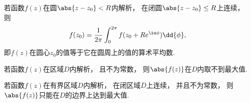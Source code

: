 \begin{theorem}[解析函数的平均值定理]\label{theorem:解析函数的积分表示.平均值定理}
若函数\(f(z)\)在圆\(\abs{z-z_0}<R\)内解析，
在闭圆\(\abs{z-z_0} \leq R\)上连续，
则\begin{equation*}
	f(z_0)
	= \frac{1}{2\pi} \int_0^{2\pi} f(z_0+Re^{\iu\phi}) \dd{\phi},
\end{equation*}
即\(f(z)\)在圆心\(z_0\)的值等于它在圆周上的值的算术平均数.
\end{theorem}

\begin{theorem}[最大模定理]\label{theorem:解析函数的积分表示.最大模定理}
若函数\(f(z)\)在区域\(D\)内解析，
且不为常数，
则\(\abs{f(z)}\)在\(D\)内取不到最大值.
\end{theorem}

\begin{corollary}\label{theorem:解析函数的积分表示.最大模定理推论}
若函数\(f(z)\)在有界区域\(D\)内解析，
在闭区域\(\overline{D}\)上连续，
并且不为常数，
则\(\abs{f(z)}\)只能在\(D\)的边界上达到最大值.
\end{corollary}

